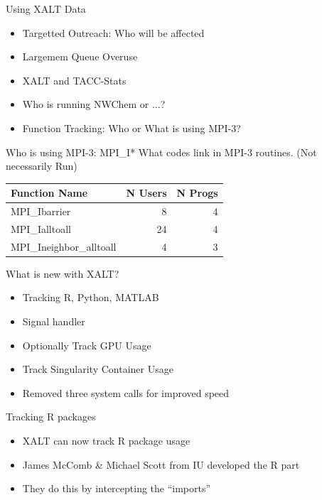 \documentclass{beamer}
\begin{document}
\begin{frame}{Using XALT Data}
  \begin{itemize}
    \item Targetted Outreach: Who will be affected
    \item Largemem Queue Overuse
    \item XALT and TACC-Stats
    \item Who is running NWChem or ...?
    \item Function Tracking: Who or What is using MPI-3?      
  \end{itemize}
\end{frame}

\begin{frame}{Who is using MPI-3: MPI\_I*}
    What codes link in MPI-3 routines.  (Not necessarily Run)
    \begin{tabular}{|l|r|r|}
        \hline
        Function Name            & N Users    & N Progs \\\hline\hline
        MPI\_Ibarrier            &  8         & 4       \\\hline
        MPI\_Ialltoall           & 24         & 4       \\\hline
        MPI\_Ineighbor\_alltoall &  4         & 3       \\\hline
    \end{tabular}

\end{frame}

\begin{frame}{What is new with XALT?}
  \begin{itemize}
    \item Tracking R, Python, MATLAB
    \item Signal handler
    \item Optionally Track GPU Usage
    \item Track Singularity Container Usage
    \item Removed three system calls for improved speed
  \end{itemize}
\end{frame}

\begin{frame}{Tracking R packages}
  \begin{itemize}
    \item XALT can now track R package usage
    \item James McComb \& Michael Scott from IU developed the R part
    \item They do this by intercepting the ``imports''
  \end{itemize}
\end{frame}
\end{document}
